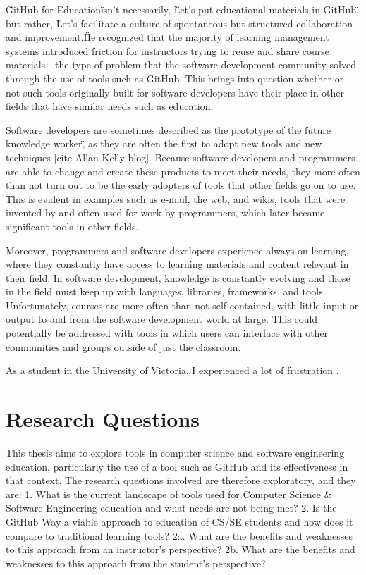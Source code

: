 \"GitHub for Education\" isn’t necessarily, \"Let’s put educational materials in GitHub\", but rather, \"Let’s facilitate a culture of spontaneous-but-structured collaboration and improvement.\"

He recognized that the majority of learning management systems introduced friction for instructors trying to reuse and share course materials - the type of problem that the software development community solved through the use of tools such as GitHub. This brings into question whether or not such tools originally built for software developers have their place in other fields that have similar needs such as education.

Software developers are sometimes described as the \"prototype of the future knowledge worker\", as they are often the first to adopt new tools and new techniques [cite Allan Kelly blog]. Because software developers and programmers are able to change and create these products to meet their needs, they more often than not turn out to be the early adopters of tools that other fields go on to use. This is evident in examples such as e-mail, the web, and wikis, tools that were invented by and often used for work by programmers, which later became significant tools in other fields.


Moreover, programmers and software developers experience always-on learning, where they constantly have access to learning materials and content relevant in their field. In software development, knowledge is constantly evolving and those in the field must keep up with languages, libraries, frameworks, and tools. Unfortunately, courses are more often than not self-contained, with little input or output to and from the software development world at large. This could potentially be addressed with tools in which users can interface with other communities and groups outside of just the classroom.

As a student in the University of Victoria, I experienced a lot of frustration .

\section{Research Questions}
This thesis aims to explore tools in computer science and software engineering education, particularly the use of a tool such as GitHub and its effectiveness in that context. The research questions involved are therefore exploratory, and they are:
1. What is the current landscape of tools used for Computer Science \& Software Engineering education and what needs are not being met?
2. Is the GitHub Way a viable approach to education of CS/SE students and how does it compare to traditional learning tools?
2a. What are the benefits and weaknesses to this approach from an instructor's perspective?
2b. What are the benefits and weaknesses to this approach from the student's perspective?

